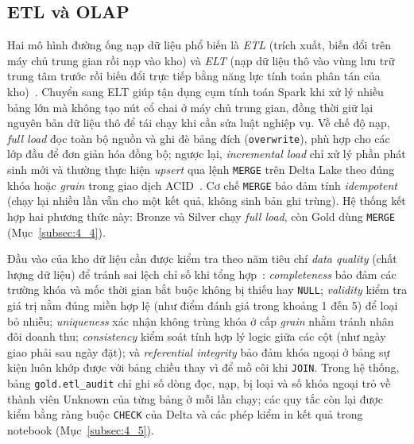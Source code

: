 \documentclass[a4paper]{article}
\begin{document}
\subsection{ETL và OLAP}
\label{subsec:2_3}

Hai mô hình đường ống nạp dữ liệu phổ biến là \textit{ETL} (trích xuất, biến đổi trên máy chủ trung gian rồi nạp vào kho) và \textit{ELT} (nạp dữ liệu thô vào vùng lưu trữ trung tâm trước rồi biến đổi trực tiếp bằng năng lực tính toán phân tán của kho)~\cite{bib:kimball2013,bib:databricks}. Chuyển sang ELT giúp tận dụng cụm tính toán Spark khi xử lý nhiều bảng lớn mà không tạo nút cổ chai ở máy chủ trung gian, đồng thời giữ lại nguyên bản dữ liệu thô để tái chạy khi cần sửa luật nghiệp vụ. Về chế độ nạp, \textit{full load} đọc toàn bộ nguồn và ghi đè bảng đích (\texttt{overwrite}), phù hợp cho các lớp đầu để đơn giản hóa đồng bộ; ngược lại, \textit{incremental load} chỉ xử lý phần phát sinh mới và thường thực hiện \textit{upsert} qua lệnh \texttt{MERGE} trên Delta Lake theo đúng khóa hoặc \textit{grain} trong giao dịch ACID~\cite{bib:databricks}. Cơ chế \texttt{MERGE} bảo đảm tính \textit{idempotent} (chạy lại nhiều lần vẫn cho một kết quả, không sinh bản ghi trùng). Hệ thống kết hợp hai phương thức này: Bronze và Silver chạy \textit{full load}, còn Gold dùng \texttt{MERGE} (Mục~\ref{subsec:4_4}).

Đầu vào của kho dữ liệu cần được kiểm tra theo năm tiêu chí \textit{data quality} (chất lượng dữ liệu) để tránh sai lệch chỉ số khi tổng hợp~\cite{bib:kimball2013}: \textit{completeness} bảo đảm các trường khóa và mốc thời gian bắt buộc không bị thiếu hay \texttt{NULL}; \textit{validity} kiểm tra giá trị nằm đúng miền hợp lệ (như điểm đánh giá trong khoảng 1 đến 5) để loại bỏ nhiễu; \textit{uniqueness} xác nhận không trùng khóa ở cấp \textit{grain} nhằm tránh nhân đôi doanh thu; \textit{consistency} kiểm soát tính hợp lý logic giữa các cột (như ngày giao phải sau ngày đặt); và \textit{referential integrity} bảo đảm khóa ngoại ở bảng sự kiện luôn khớp được với bảng chiều thay vì để mồ côi khi \texttt{JOIN}. Trong hệ thống, bảng \texttt{gold.etl\_audit} chỉ ghi số dòng đọc, nạp, bị loại và số khóa ngoại trỏ về thành viên Unknown của từng bảng ở mỗi lần chạy; các quy tắc còn lại được kiểm bằng ràng buộc \texttt{CHECK} của Delta và các phép kiểm in kết quả trong notebook (Mục~\ref{subsec:4_5}).
\end{document}
